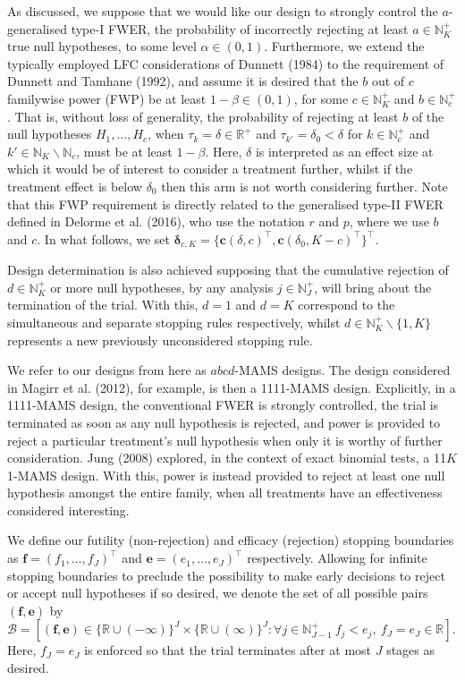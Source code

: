 \documentclass{article}
\numberwithin{equation}{section}
\theoremstyle{plain}
\begin{document}
As discussed, we suppose that we would like our design to strongly control the $a$-generalised type-I FWER, the probability of incorrectly rejecting at least $a\in\mathbb{N}_K^+$ true null hypotheses, to some level $\alpha\in(0,1)$. Furthermore, we extend the typically employed LFC considerations of Dunnett (1984) to the requirement of Dunnett and Tamhane (1992), and assume it is desired that the $b$ out of $c$ familywise power (FWP) be at least $1-\beta\in(0,1)$, for some $c\in\mathbb{N}_K^+$ and $b\in\mathbb{N}_c^+$. That is, without loss of generality, the probability of rejecting at least $b$ of the null hypotheses $H_{1},\dots,H_{c}$, when $\tau_k=\delta\in\mathbb{R}^+$ and $\tau_{k'}=\delta_0<\delta$ for $k\in\mathbb{N}_c^+$ and $k'\in\mathbb{N}_K\backslash\mathbb{N}_c$, must be at least $1-\beta$. Here, $\delta$ is interpreted as an effect size at which it would be of interest to consider a treatment further, whilst if the treatment effect is below $\delta_0$ then this arm is not worth considering further. Note that this FWP requirement is directly related to the generalised type-II FWER defined in Delorme et al. (2016), who use the notation $r$ and $p$, where we use $b$ and $c$. In what follows, we set $\boldsymbol{\delta}_{c,K}=\{\boldsymbol{c}(\delta,c)^\top,\boldsymbol{c}(\delta_0,K-c)^\top\}^\top$.

Design determination is also achieved supposing that the cumulative rejection of $d\in\mathbb{N}_K^+$ or more null hypotheses, by any analysis $j\in\mathbb{N}_J^+$, will bring about the termination of the trial. With this, $d=1$ and $d=K$ correspond to the simultaneous and separate stopping rules respectively, whilst $d\in\mathbb{N}_{K}^+\backslash\{1,K\}$ represents a new previously unconsidered stopping rule.

We refer to our designs from here as $abcd$-MAMS designs. The design considered in Magirr et al. (2012), for example, is then a 1111-MAMS design. Explicitly, in a 1111-MAMS design, the conventional FWER is strongly controlled, the trial is terminated as soon as any null hypothesis is rejected, and power is provided to reject a particular treatment's null hypothesis when only it is worthy of further consideration. Jung (2008) explored, in the context of exact binomial tests, a 11$K$1-MAMS design. With this, power is instead provided to reject at least one null hypothesis amongst the entire family, when all treatments have an effectiveness considered interesting.

We define our futility (non-rejection) and efficacy (rejection) stopping boundaries as $\boldsymbol{f}=(f_1,\dots,f_J)^\top$ and $\boldsymbol{e}=(e_1,\dots,e_J)^\top$ respectively. Allowing for infinite stopping boundaries to preclude the possibility to make early decisions to reject or accept null hypotheses if so desired, we denote the set of all possible pairs $(\boldsymbol{f},\boldsymbol{e})$ by $\mathscr{B}=\left[ (\boldsymbol{f},\boldsymbol{e})\in\{\mathbb{R}\cup(-\infty)\}^J\times\{\mathbb{R}\cup(\infty)\}^J : \forall j\in\mathbb{N}_{J-1}^+\ f_j< e_j,\ f_J=e_J\in\mathbb{R}\right]$. Here, $f_J=e_J$ is enforced so that the trial terminates after at most $J$ stages as desired.
\end{document}
